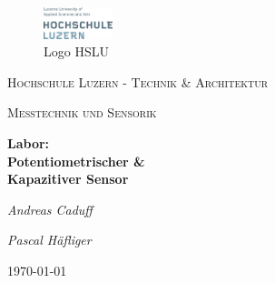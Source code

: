 
\begin{titlepage}
	\centering
	
	\begin{figure}[H]
        \centering
        \includegraphics[width=0.18\textwidth]{pic/logo.png}


        
        \captionsetup{textformat=empty,labelformat=empty} %
        \caption{Logo HSLU}
    \end{figure}

	
	
	\par\vspace{1cm}
	{\scshape\LARGE Hochschule Luzern - Technik \& Architektur\par}
	\vspace{1cm}
	{\scshape\Large Messtechnik und Sensorik\par}
	\vspace{1.5cm}
	{\huge\bfseries Labor: \\ Potentiometrischer \& \\ Kapazitiver Sensor\par}
	\vspace{2cm}
	{\Large\itshape Andreas Caduff\par}
	{\Large\itshape Pascal Häfliger\par}
	\vfill
	\vspace{1cm}
	
	

	\vfill  %

	{\large \today\par}
\end{titlepage}



\clearpage